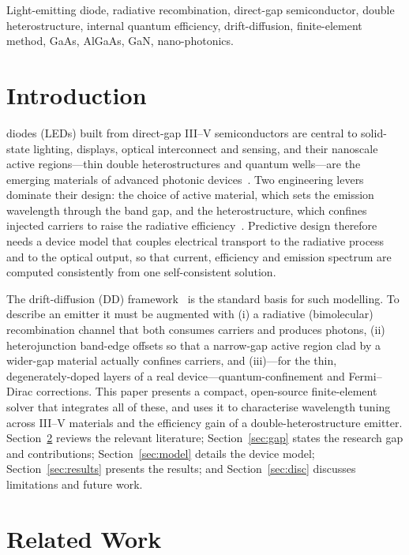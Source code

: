 \documentclass[conference]{IEEEtran}
\begin{document}
\begin{IEEEkeywords}
Light-emitting diode, radiative recombination, direct-gap semiconductor,
double heterostructure, internal quantum efficiency, drift-diffusion,
finite-element method, GaAs, AlGaAs, GaN, nano-photonics.
\end{IEEEkeywords}

\section{Introduction}
 diodes (LEDs) built from direct-gap III--V
semiconductors are central to solid-state lighting, displays, optical interconnect
and sensing, and their nanoscale active regions---thin double heterostructures and
quantum wells---are the emerging materials of advanced photonic
devices~\cite{schubert,alferov}. Two engineering levers dominate their design: the
choice of active material, which sets the emission wavelength through the band gap,
and the heterostructure, which confines injected carriers to raise the radiative
efficiency~\cite{kroemer,caseypanish}. Predictive design therefore needs a device
model that couples electrical transport to the radiative process and to the
optical output, so that current, efficiency and emission spectrum are computed
consistently from one self-consistent solution.

The drift-diffusion (DD) framework~\cite{selberherr,vanroosbroeck} is the standard
basis for such modelling. To describe an emitter it must be augmented with (i) a
radiative (bimolecular) recombination channel that both consumes carriers and
produces photons, (ii) heterojunction band-edge offsets so that a narrow-gap
active region clad by a wider-gap material actually confines carriers, and
(iii)---for the thin, degenerately-doped layers of a real device---quantum-confinement
and Fermi--Dirac corrections. This paper presents a compact, open-source
finite-element solver that integrates all of these, and uses it to characterise
wavelength tuning across III--V materials and the efficiency gain of a
double-heterostructure emitter. Section~\ref{sec:related} reviews the relevant
literature; Section~\ref{sec:gap} states the research gap and contributions;
Section~\ref{sec:model} details the device model; Section~\ref{sec:results}
presents the results; and Section~\ref{sec:disc} discusses limitations and future
work.

\section{Related Work}
\label{sec:related}
\end{document}
